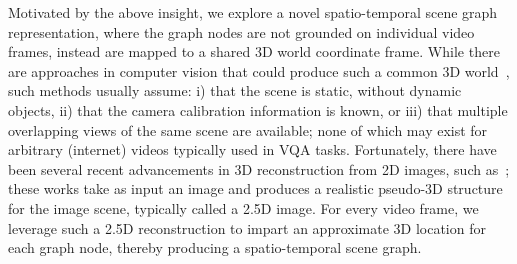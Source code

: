 \documentclass[letterpaper]{article} %
\begin{document}
Motivated by the above insight, we explore a novel spatio-temporal scene graph representation, where the graph nodes are not grounded on individual video frames, instead are mapped to a shared 3D world coordinate frame. While there are approaches in computer vision that could produce such a common 3D world~\cite{multiview}, such methods usually assume: i) that the scene is static, without dynamic objects,  ii) that the camera calibration information is known, or iii) that multiple overlapping views of the same scene are available; none of which may exist for arbitrary (internet) videos typically used in VQA tasks. Fortunately, there have been several recent advancements in 3D reconstruction from 2D images, such as~\cite{ranftl2019towards,fu2018deep}; these works take as input an image and produces a realistic pseudo-3D structure for the image scene, typically called a 2.5D image. For every video frame, we leverage such a 2.5D reconstruction to impart an approximate 3D location for each graph node, thereby producing a \name spatio-temporal scene graph.
\end{document}
